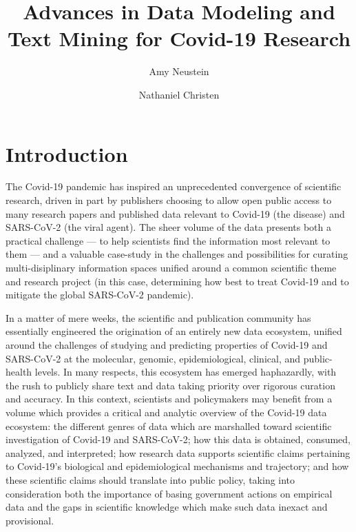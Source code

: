 \documentclass{statsoc}
\title[Short title]{Advances in Data Modeling and Text Mining for Covid-19 Research}
\author[Amy Neustein]{Amy Neustein}
\author[Amy Neustein]{Nathaniel Christen}
\newcommand{\p}[1]{

\vspace{.75em}#1}
\begin{document}


\section{Introduction}

\p{The Covid-19 pandemic has inspired an unprecedented 
convergence of scientific research, driven in part 
by publishers choosing to allow open public access 
to many research papers and published data 
relevant to Covid-19 (the disease) and SARS-CoV-2 
(the viral agent).  The sheer volume of the data 
presents both a practical challenge --- to help 
scientists find the information most relevant to them 
--- and a valuable case-study in the challenges and 
possibilities for curating multi-disiplinary 
information spaces unified around a common 
scientific theme and research project (in this case, 
determining how best to treat Covid-19 and to 
mitigate the global SARS-CoV-2 pandemic).}

\p{In a matter of mere weeks, the scientific and publication 
community has essentially engineered the origination of 
an entirely new data ecosystem, unified around the 
challenges of studying and predicting properties 
of Covid-19 and SARS-CoV-2 at the molecular, genomic, 
epidemiological, clinical, and public-health levels.  
In many respects, this ecosystem has emerged 
haphazardly, with the rush to publicly share 
text and data taking priority over rigorous 
curation and accuracy.  In this context, 
scientists and policymakers may benefit from a 
volume which provides a critical and analytic 
overview of the Covid-19 data ecosystem: the 
different genres of data which are marshalled 
toward scientific investigation of Covid-19 
and SARS-CoV-2; how this data is obtained, 
consumed, analyzed, and interpreted; how 
research data supports scientific claims 
pertaining to Covid-19's biological and 
epidemiological mechanisms and trajectory; 
and how these scientific claims should 
translate into public policy, taking into 
consideration both the importance of 
basing government actions on empirical data and 
the gaps in scientific knowledge which make 
such data inexact and provisional.} 
\end{document}

